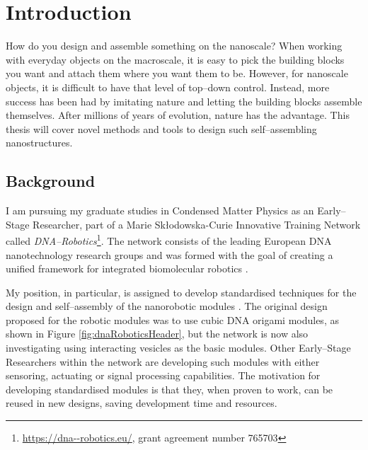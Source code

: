 
\chapter{Introduction}\label{ch:1-intro}

\minitoc

How do you design and assemble something on the nanoscale? When working with everyday objects on the macroscale, it is easy to pick the building blocks you want and attach them where you want them to be. However, for nanoscale objects, it is difficult to have that level of top--down control. Instead, more success has been had by imitating nature and letting the building blocks assemble themselves. After millions of years of evolution, nature has the advantage. This thesis will cover novel methods and tools to design such self--assembling nanostructures.

\section{Background}
I am pursuing my graduate studies in Condensed Matter Physics as an Early--Stage Researcher, part of a Marie Skłodowska-Curie Innovative Training Network called \emph{DNA--Robotics}\footnote{\url{https://dna--robotics.eu/}, grant agreement number 765703}. The network consists of the leading European DNA nanotechnology research groups and was formed with the goal of creating a unified framework for integrated biomolecular robotics \cite{dnaroboticsResearch}.

My position, in particular, is assigned to develop standardised techniques for the design and self--assembly of the nanorobotic modules \cite{dnaroboticsESR12}. The original design proposed for the robotic modules was to use cubic DNA origami modules, as shown in Figure \ref{fig:dnaRoboticsHeader}, but the network is now also investigating using interacting vesicles as the basic modules. Other Early--Stage Researchers within the network are developing such modules with either sensoring, actuating or signal processing capabilities. The motivation for developing standardised modules is that they, when proven to work, can be reused in new designs, saving development time and resources.

